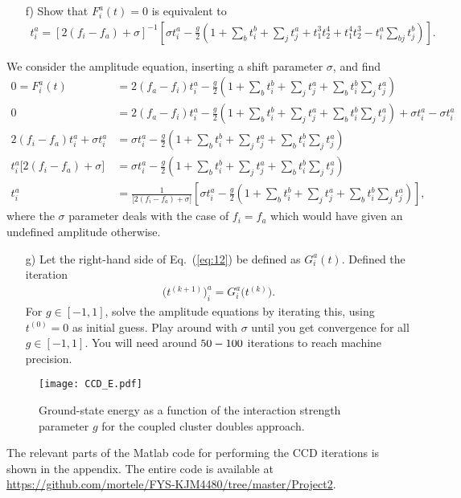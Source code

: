 \documentclass[a4paper]{article}
\newcommand{\eq} [1]{Eq.\ (\ref{eq:#1})}
\newcommand{\nn}{\nonumber}
\begin{document}
\begin{exframe}
\begin{itemize}
  \item[f)] Show that $F^a_i(t)=0$ is equivalent to
  \begin{align}
  t_i^a = \left[2(f_i-f_a)+\sigma \right]^{-1} \left[  \sigma t_i^a - \frac{g}{2}\left( 1 + \sum_b t_i^b + \sum_j t_j^a + t_1^3 t_2^4 + t_1^4 t_2^3 - t_i^a\sum_{bj} t_j^b \right) \right].
  \end{align}
\end{itemize}
\end{exframe}
We consider the amplitude equation, inserting a shift parameter $\sigma$, and find
\begin{align}
0=F_i^a(t)&=2(f_a-f_i)t_i^a - \frac{g}{2}\left(1+\sum_b t_i^b + \sum_j t_j^a + \sum_b t_i^b \sum_j t_j^a \right) \nn\\
0 &= 2(f_a-f_i)t_i^a - \frac{g}{2}\left(1+\sum_b t_i^b + \sum_j t_j^a + \sum_b t_i^b \sum_j t_j^a \right) +\sigma t_i^a - \sigma t_i^a \nn\\
%
2(f_i - f_a)t_i^a+ \sigma t_i^a &=\sigma t_i^a - \frac{g}{2}\left(1+\sum_b t_i^b + \sum_j t_j^a + \sum_b t_i^b \sum_j t_j^a \right) \nn\\
%
t_i^a \Big[2(f_i - f_a)+ \sigma \Big] &=\sigma t_i^a - \frac{g}{2}\left(1+\sum_b t_i^b + \sum_j t_j^a + \sum_b t_i^b \sum_j t_j^a \right) \nn\\
%
t_i^a &= \frac{1}{\Big[2(f_i - f_a)+ \sigma \Big]} \left[\sigma t_i^a - \frac{g}{2}\left(1+\sum_b t_i^b + \sum_j t_j^a + \sum_b t_i^b \sum_j t_j^a \right) \right], \label{eq:12}
\end{align}
where the $\sigma$ parameter deals with the case of $f_i=f_a$ which would have given an undefined amplitude otherwise.

\begin{exframe}
\begin{itemize}
  \item[g)] Let the right-hand side of \eq{12} be defined as $G_i^a(t)$. Defined the iteration
  \begin{align}
  \big( t^{(k+1)} \big)_i^a = G_i^a\big(t^{(k)} \big).
  \end{align}
  For $g\in [-1,1]$, solve the amplitude equations by iterating this, using $t^{(0)}=0$ as initial guess. Play around with $\sigma$ until you get convergence for all $g\in[-1,1]$. You will need around $50\--100$ iterations to reach machine precision.
\end{itemize}
\end{exframe}
\begin{figure}[p]
\centering
\texttt{[image: CCD\_E.pdf]}
\caption{Ground-state energy as a function of the interaction strength parameter $g$ for the coupled cluster doubles approach. \label{fig:20}}
\end{figure}
The relevant parts of the {\sc Matlab} code for performing the CCD iterations is shown in the appendix. The entire code is available at \url{https://github.com/mortele/FYS-KJM4480/tree/master/Project2}.
\end{document}
